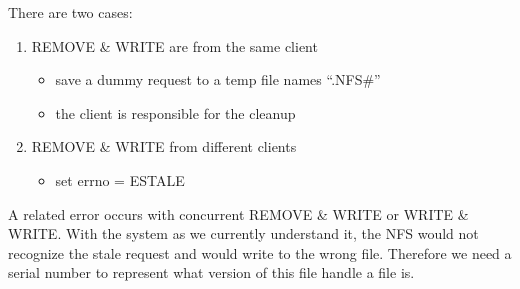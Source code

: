 \documentclass[../../lecture_notes.tex]{subfiles}
\begin{document}
There are two cases:
\begin{enumerate}[nosep]
\item REMOVE \& WRITE are from the same client
	\begin{itemize}
		\item save a dummy request to a temp file names “.NFS\#”
		\item the client is responsible for the cleanup
	\end{itemize}
\item REMOVE \& WRITE from different clients
	\begin{itemize}
		\item set errno = ESTALE
	\end{itemize}
\end{enumerate}

A related error occurs with concurrent REMOVE \& WRITE or WRITE \& WRITE. With the system as we currently understand it, the NFS would not recognize the stale request and would write to the wrong file. Therefore we need a serial number to represent what version of this file handle a file is.
\end{document}
